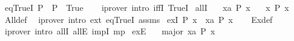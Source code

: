 \begin{isabellebody}
%
\isatagdocument
%
\isamarkuptrue%
%
\endisatagdocument
{\isafolddocument}%
%
\isadelimdocument
%
\endisadelimdocument
{}\isamarkupfalse%
\ eqTrueI{\isacharcolon}{\kern0pt}\ {\isachardoublequoteopen}P\ {\isasymLongrightarrow}\ P\ {\isacharequal}{\kern0pt}\ True{\isachardoublequoteclose}\isanewline
%
\isadelimproof
\ \ %
\endisadelimproof
%
\isatagproof
{}\isamarkupfalse%
\ {\isacharparenleft}{\kern0pt}iprover\ intro{\isacharcolon}{\kern0pt}\ iffI\ TrueI{\isacharparenright}{\kern0pt}%
\endisatagproof
{\isafoldproof}%
%
\isadelimproof
%
\endisadelimproof
%
\isadelimdocument
%
\endisadelimdocument
%
\isatagdocument
%
\isamarkuptrue%
%
\endisatagdocument
{\isafolddocument}%
%
\isadelimdocument
%
\endisadelimdocument
{}\isamarkupfalse%
\ allI{\isacharcolon}{\kern0pt}\isanewline
\ \ \ {\isachardoublequoteopen}{\isasymAnd}x{\isacharcolon}{\kern0pt}{\isacharcolon}{\kern0pt}{\isacharprime}{\kern0pt}a{\isachardot}{\kern0pt}\ P\ x{\isachardoublequoteclose}\isanewline
\ \ \ {\isachardoublequoteopen}{\isasymforall}x{\isachardot}{\kern0pt}\ P\ x{\isachardoublequoteclose}\isanewline
%
\isadelimproof
\ \ %
\endisadelimproof
%
\isatagproof
{}\isamarkupfalse%
\ All{\isacharunderscore}{\kern0pt}def\ \isamarkupfalse%
\ {\isacharparenleft}{\kern0pt}iprover\ intro{\isacharcolon}{\kern0pt}\ ext\ eqTrueI\ assms{\isacharparenright}{\kern0pt}%
\endisatagproof
{\isafoldproof}%
%
\isadelimproof
%
\endisadelimproof
%
\isadelimdocument
%
\endisadelimdocument
%
\isatagdocument
%
\isamarkuptrue%
%
\endisatagdocument
{\isafolddocument}%
%
\isadelimdocument
%
\endisadelimdocument
{}\isamarkupfalse%
\ exI{\isacharcolon}{\kern0pt}\ {\isachardoublequoteopen}P\ x\ {\isasymLongrightarrow}\ {\isasymexists}x{\isacharcolon}{\kern0pt}{\isacharcolon}{\kern0pt}{\isacharprime}{\kern0pt}a{\isachardot}{\kern0pt}\ P\ x{\isachardoublequoteclose}\isanewline
%
\isadelimproof
\ \ %
\endisadelimproof
%
\isatagproof
{}\isamarkupfalse%
\ Ex{\isacharunderscore}{\kern0pt}def\ \isamarkupfalse%
\ {\isacharparenleft}{\kern0pt}iprover\ intro{\isacharcolon}{\kern0pt}\ allI\ allE\ impI\ mp{\isacharparenright}{\kern0pt}%
\endisatagproof
{\isafoldproof}%
%
\isadelimproof
\isanewline
%
\endisadelimproof
\isanewline
{}\isamarkupfalse%
\ exE{\isacharcolon}{\kern0pt}\isanewline
\ \ \ major{\isacharcolon}{\kern0pt}\ {\isachardoublequoteopen}{\isasymexists}x{\isacharcolon}{\kern0pt}{\isacharcolon}{\kern0pt}{\isacharprime}{\kern0pt}a{\isachardot}{\kern0pt}\ P\ x{\isachardoublequoteclose}\isanewline

\end{isabellebody}
